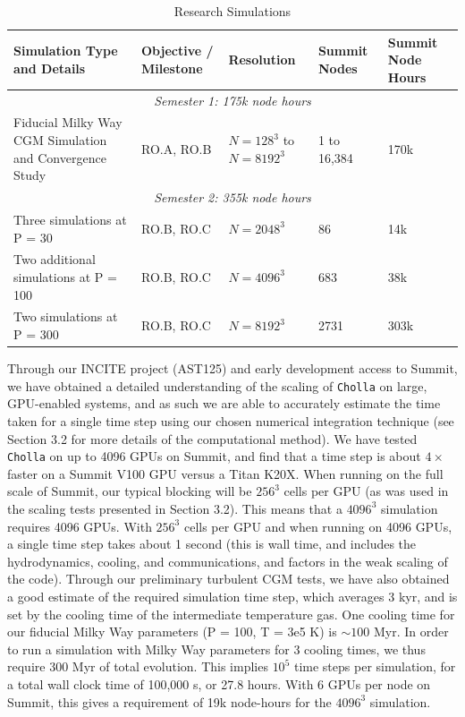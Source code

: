 \documentclass[11pt,letterpaper,english]{article}
\begin{document}
\begin{table}[h]
\caption{Research Simulations}
\label{table:RS}
\begin{tabular}{|p{2in}|p{1in}|p{0.7in}|p{0.5in}|p{0.7in}|} 
\hline
{\bf Simulation Type and Details} & {\bf Objective / Milestone} & {\bf Resolution} & {\bf Summit Nodes} & {\bf Summit Node Hours} \\ \hline
\multicolumn{5}{|c|}{\it Semester 1: 175k node hours} \\ \hline
Fiducial Milky Way CGM Simulation and Convergence Study & RO.A, RO.B & $N = 128^3$ to $N=8192^3$ & 1 to 16,384 & 170k \\ \hline
\multicolumn{5}{|c|}{\it Semester 2: 355k node hours} \\ \hline
Three simulations at P = 30 & RO.B, RO.C & $N = 2048^3$ & 86 & 14k\\ \hline
Two additional simulations at P = 100 & RO.B, RO.C & $N=4096^3$ & 683 & 38k \\ \hline
Two simulations at P = 300 & RO.B, RO.C & $N=8192^3$ & 2731 & 303k \\ \hline
\end{tabular}
\end{table}


Through our INCITE project (AST125) and early development access to Summit, we have obtained a detailed understanding of the scaling of {\tt Cholla} on large, GPU-enabled systems, and as such we are able to accurately estimate the time taken for a single time step using our chosen numerical integration technique (see Section 3.2 for more details of the computational method). We have tested {\tt Cholla} on up to 4096 GPUs on Summit, and find that a time step is about $4\times$ faster on a Summit V100 GPU versus a Titan K20X. When running on the full scale of Summit, our typical blocking will be $256^3$ cells per GPU (as was used in the scaling tests presented in Section 3.2). This means that a $4096^3$ simulation requires 4096 GPUs. With $256^3$ cells per GPU and when running on 4096 GPUs, a single time step takes about 1 second (this is wall time, and includes the hydrodynamics, cooling, and communications, and factors in the weak scaling of the code). Through our preliminary turbulent CGM tests, we have also obtained a good estimate of the required simulation time step, which averages 3 kyr, and is set by the cooling time of the intermediate temperature gas. One cooling time for our fiducial Milky Way parameters (P = 100, T = 3e5 K) is $\sim100$ Myr. In order to run a simulation with Milky Way parameters for 3 cooling times, we thus require 300 Myr of total evolution. This implies $10^5$ time steps per simulation, for a total wall clock time of 100,000 s, or 27.8 hours. With 6 GPUs per node on Summit, this gives a requirement of 19k node-hours for the $4096^3$ simulation.
\end{document}

